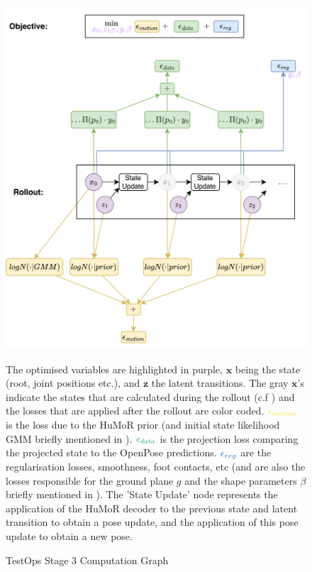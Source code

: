 \begin{figure}
    \centering
    \includegraphics[width=1\textwidth]{Figures/humor/improvement/computation_graph_humor.png}
    \caption{TestOps Stage 3 Computation Graph}
    \label{fig:humor_rollout_graph}
    \medskip
    \small
    The optimised variables are highlighted in purple, $\mathbf{x}$ being the state (root, joint positions etc.), and $\mathbf{z}$ the latent transitions. The gray $\mathbf{x}$'s indicate the states that are calculated during the rollout (c.f ) and the losses that are applied after the rollout are color coded. $\textcolor{Goldenrod}{\epsilon_{motion}}$ is the loss due to the HuMoR prior (and initial state likelihood GMM briefly mentioned in ). $\textcolor{ForestGreen}{\epsilon_{data}}$ is the projection loss comparing the projected state to the OpenPose predictions. $\textcolor{RoyalBlue}{\epsilon_{reg}}$ are the regularisation losses, smoothness, foot contacts, etc (and are also the losses responsible for the ground plane $g$ and the shape parameters $\beta$ briefly mentioned in ). The 'State Update' node represents the application of the HuMoR decoder to the previous state and latent transition to obtain a pose update, and the application of this pose update to obtain a new pose.
\end{figure}

